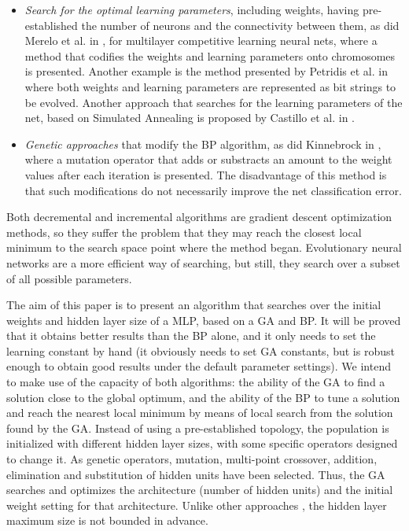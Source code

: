 \documentclass{elsart}
\begin{document}
\begin{itemize}
      \item \emph{Search for the optimal learning parameters}, including weights, having pre-established the number of neurons and the connectivity between them, as did Merelo et al. in \cite{competitiveNNGA}, for multilayer competitive learning neural nets, where a method that codifies the weights and learning parameters onto chromosomes is presented. Another example is the method presented by Petridis et al. in \cite{Petridis} where both weights and learning parameters are represented as bit strings to be evolved. Another approach that searches for the learning parameters of the net, based on Simulated Annealing is proposed by Castillo et al. in \cite{Castillo2}.
      \item \emph{Genetic approaches} that modify the BP algorithm, as did Kinnebrock in \cite{Kinnebrock}, where a mutation operator that adds or substracts an amount to the weight values after each iteration is presented. The disadvantage of this method is that such modifications do not necessarily improve the net classification error.
\end{itemize}

Both decremental and incremental algorithms are gradient descent optimization methods, so they suffer the problem that they may reach the closest local minimum to the search space point where the method began.
Evolutionary neural networks are a more efficient way of searching, but still, they search over a subset of all possible parameters.

The aim of this paper is to present an algorithm that searches over the initial weights and hidden layer size of a MLP, based on a GA and BP. It will be proved that it obtains better results than the BP alone, and it only needs to set the learning constant by hand (it obviously needs to set GA constants, but is robust enough to obtain good results under the default parameter settings).
We intend to make use of the capacity of both algorithms: the ability of the GA to find a solution close to the global optimum, and the ability of the BP to tune a solution and reach the nearest local minimum by means of local search from the solution found by the GA.
Instead of using a pre-established topology, the population is initialized with different hidden layer sizes, with some specific operators designed to change it.
As genetic operators, mutation, multi-point crossover, addition, elimination and substitution of hidden units have been selected.
Thus, the GA searches and optimizes the architecture (number of hidden units) and the initial weight setting for that architecture.
Unlike other approaches \cite{Yao98}, the hidden layer maximum size is not bounded in advance.
\end{document}
